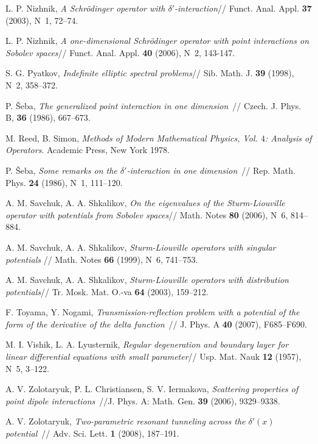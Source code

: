 \documentclass[11pt,english]{amsart}
\begin{document}
\begin{thebibliography}{99}
L. P. Nizhnik, \textit{A Schr\"odinger operator with $\delta'$-interaction}// Funct. Anal. Appl. \textbf{37} (2003),
N~1, 72--74.

L. P. Nizhnik, \textit{A one-dimensional Schr\"odinger operator with point interactions on Sobolev spaces}// Funct. Anal. Appl. \textbf{40} (2006), N~2, 143-147.

S. G. Pyatkov, \textit{Indefinite elliptic spectral problems}//
 Sib. Math. J. \textbf{39} (1998), N~2, 358--372.

P. \v{S}eba,  \textit{The generalized point interaction in one dimension}~// Czech. J.
Phys. B, \textbf{36} (1986), 667--673.

M. Reed, B.  Simon, {\it  Methods of Modern Mathematical Physics, Vol. $4$: Analysis of
Operators}. Academic Press, New York 1978.

P. \v{S}eba, \textit{Some remarks on the $\delta'$-interaction in one dimension}~// Rep.
Math. Phys. \textbf{24} (1986), N~1, 111--120.

 A. M. Savchuk, A. A. Shkalikov, \textit{On the eigenvalues of the Sturm-Liouville operator with potentials from Sobolev spaces}// Math. Notes \textbf{80} (2006), N~6, 814--884.

A. M. Savchuk, A. A. Shkalikov, \textit{Sturm-Liouville operators with singular potentials }// Math. Notes \textbf{66} (1999),  N~6, 741--753.

A. M. Savchuk, A. A. Shkalikov, \textit{Sturm-Liouville operators with distribution potentials}// Tr. Mosk. Mat. O.-va  \textbf{64} (2003), 159--212.

F. Toyama, Y. Nogami, \textit{ Transmission-reflection problem with a potential of the
form of the derivative of the delta function}~// J. Phys. A \textbf{40} (2007),
F685--F690.

M. I. Vishik, L. A. Lyusternik,
{\it  Regular degeneration and boundary layer for linear differential
    equations with small parameter}// Usp. Mat. Nauk \textbf{12} (1957), N~5, 3--122.

 A. V. Zolotaryuk, P. L. Christiansen, S. V. Iermakova,
\textit{Scattering properties of point dipole interactions}~//J. Phys. A: Math. Gen.
\textbf{39} (2006), 9329--9338.

A. V. Zolotaryuk, \textit{Two-parametric resonant tunneling across the $\delta'(x)$
potential}~// Adv. Sci. Lett. \textbf{1} (2008), 187--191.

\end{thebibliography}
\end{document}
